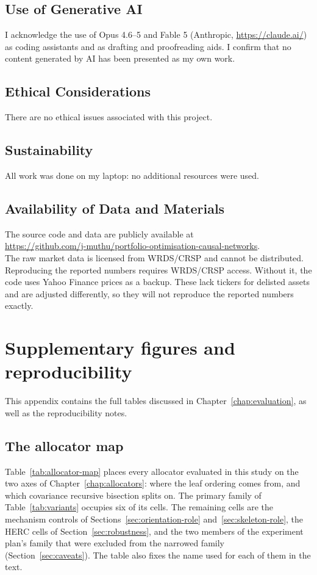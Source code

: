 \documentclass[11pt, a4paper]{report}
\begin{document}
\section*{Use of Generative AI}
I acknowledge the use of Opus 4.6--5 and Fable 5
(Anthropic, \url{https://claude.ai/}) as coding assistants
and as drafting and proofreading aids.
I confirm that no content generated by AI has been presented as my own work.

\section*{Ethical Considerations}
There are no ethical issues associated with this project.

\section*{Sustainability}
All work was done on my laptop: no additional resources were used.

\section*{Availability of Data and Materials}
The source code and data are publicly available at\\
\url{https://github.com/j-muthu/portfolio-optimisation-causal-networks}.\\
The raw market data is licensed from WRDS/CRSP and cannot be distributed.
Reproducing the reported numbers requires WRDS/CRSP access. Without it, the code uses Yahoo Finance prices as a backup. These lack tickers for delisted assets and are adjusted differently, so they will not reproduce the reported numbers exactly.

\appendix

\chapter{Supplementary figures and reproducibility}
\label{app:tables}

This appendix contains the full tables discussed in
Chapter~\ref{chap:evaluation}, as well as the reproducibility notes.

\section{The allocator map}
\label{app:allocator-map}

Table~\ref{tab:allocator-map} places every allocator evaluated in this
study on the two axes of Chapter~\ref{chap:allocators}: where the leaf
ordering comes from, and which covariance recursive bisection splits
on. The primary family of Table~\ref{tab:variants} occupies six of its
cells. The remaining cells are the mechanism controls of
Sections~\ref{sec:orientation-role} and~\ref{sec:skeleton-role}, the HERC
cells of Section~\ref{sec:robustness}, and the two members of the
experiment plan's family that were excluded from the narrowed family
(Section~\ref{sec:caveats}). The table also fixes the name used for
each of them in the text.
\end{document}
